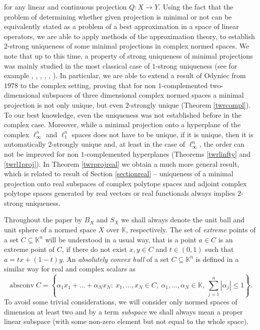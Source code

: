 \documentclass[12pt, reqno]{amsart}
\theoremstyle{definition}
\theoremstyle{remark}
\numberwithin{equation}{section}
\DeclareMathOperator{\absconv}{absconv}
\begin{document}
for any linear and continuous projection $Q: X \to Y$. Using the fact that the problem of determining whether given projection is minimal or not can be equivalently stated as a problem of a best approximation in a space of linear operators, we are able to apply methods of the approximation theory, to establish $2$-strong uniqueness of some minimal projections in complex normed spaces. We note that up to this time, a property of strong uniqueness of minimal projections was mainly studied in the most classical case of $1$-strong uniqueness (see for example \cite{baronti}, \cite{lewicki}, \cite{lewickimicek}, \cite{martinov}, \cite{martinov2}, \cite{odyniecprophet}). In particular, we are able to extend a result of Odyniec from $1978$ to the complex setting, proving that for non $1$-complemented two-dimensional subspaces of three dimensional complex normed spaces a minimal projection is not only unique, but even $2$-strongly unique (Theorem \ref{twrcompl}). To our best knowledge, even the uniqueness was not established before in the complex case. Moreover, while a minimal projection onto a hyperplane of the complex $\ell_{\infty}^n$ and $\ell_1^n$ spaces does not have to be unique, if it is unique, then it is automatically $2$-strongly unique and, at least in the case of $\ell_{\infty}^n$, the order can not be improved for non $1$-complemented hyperplanes (Theorems \ref{twrlinfty} and \ref{twrl1proj}). In Theorem \ref{twrprojreal} we obtain a much more general result, which is related to result of Section \ref{sectionreal} -- uniqueness of a minimal projection onto real subspaces of complex polytope spaces and adjoint complex polytope spaces generated by real vectors or real functionals always implies $2$-strong uniqueness. 

Throughout the paper by $B_X$ and $S_X$ we shall always denote the unit ball and unit sphere of a normed space $X$ over $\mathbb{K}$, respectively. The set of \emph{extreme} points of a set $C \subseteq \mathbb{K}^n$ will be understood in a usual way, that is a point $a \in C$ is an extreme point of $C$, if there do not exist $x, y \in C$ and $t \in (0, 1)$ such that $a = tx + (1-t)y$. An \emph{absolutely convex hull} of a set $C \subseteq \mathbb{K}^n$ is defined in a similar way for real and complex scalars as
$$\absconv C = \left \{ \alpha_1x_1 + \ldots +  \alpha_Nx_N: \ x_1, \ldots, x_N \in C, \ \alpha_1, \ldots, \alpha_N \in \mathbb{K}, \ \sum_{j=1}^{n} |\alpha_j| \leq 1 \right \}. $$
To avoid some trivial considerations, we will consider only normed spaces of dimension at least two and by a term \emph{subspace} we shall always mean a proper linear subspace (with some non-zero element but not equal to the whole space).
\end{document}
